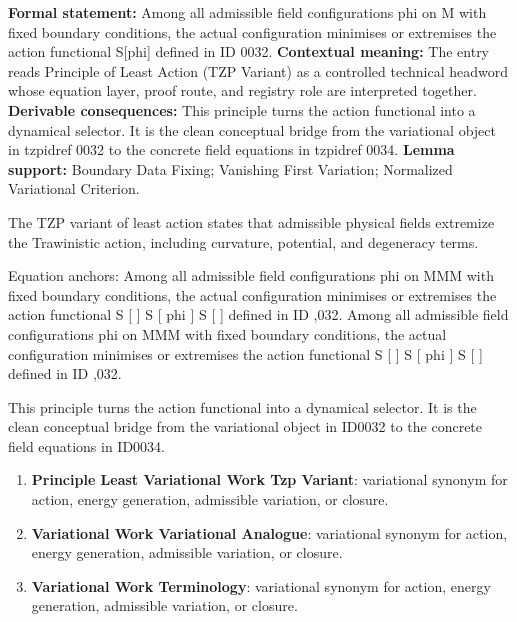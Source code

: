 \begingroup\footnotesize\setlength{\emergencystretch}{3em}\sloppy
\textbf{Formal statement:} Among all admissible field configurations phi on M with fixed boundary conditions, the actual configuration minimises or extremises the action functional S[phi] defined in ID 0032. \textbf{Contextual meaning:} The entry reads Principle of Least Action (TZP Variant) as a controlled technical headword whose equation layer, proof route, and registry role are interpreted together. \textbf{Derivable consequences:} This principle turns the action functional into a dynamical selector. It is the clean conceptual bridge from the variational object in tzpidref 0032 to the concrete field equations in tzpidref 0034. \textbf{Lemma support:} Boundary Data Fixing; Vanishing First Variation; Normalized Variational Criterion.\par
\endgroup

The TZP variant of least action states that admissible physical fields extremize the Trawinistic action, including curvature, potential, and degeneracy terms.

Equation anchors: Among all admissible field configurations  phi  on MMM with fixed boundary conditions, the actual configuration minimises or extremises the action functional S [   ] S [ phi ] S [   ] defined in ID ,032. Among all admissible field configurations  phi  on MMM with fixed boundary conditions, the actual configuration minimises or extremises the action functional S [   ] S [ phi ] S [   ] defined in ID ,032.

This principle turns the action functional into a dynamical selector. It is the clean conceptual bridge from the variational object in ID0032 to the concrete field equations in ID0034.
\endgroup

\begingroup\footnotesize\sloppy
\begin{enumerate}[leftmargin=1.35em,itemsep=1pt,topsep=1pt,parsep=0pt]
\item \textbf{Principle Least Variational Work Tzp Variant}: variational synonym for action, energy generation, admissible variation, or closure.
\item \textbf{Variational Work Variational Analogue}: variational synonym for action, energy generation, admissible variation, or closure.
\item \textbf{Variational Work Terminology}: variational synonym for action, energy generation, admissible variation, or closure.
\end{enumerate}
\endgroup

